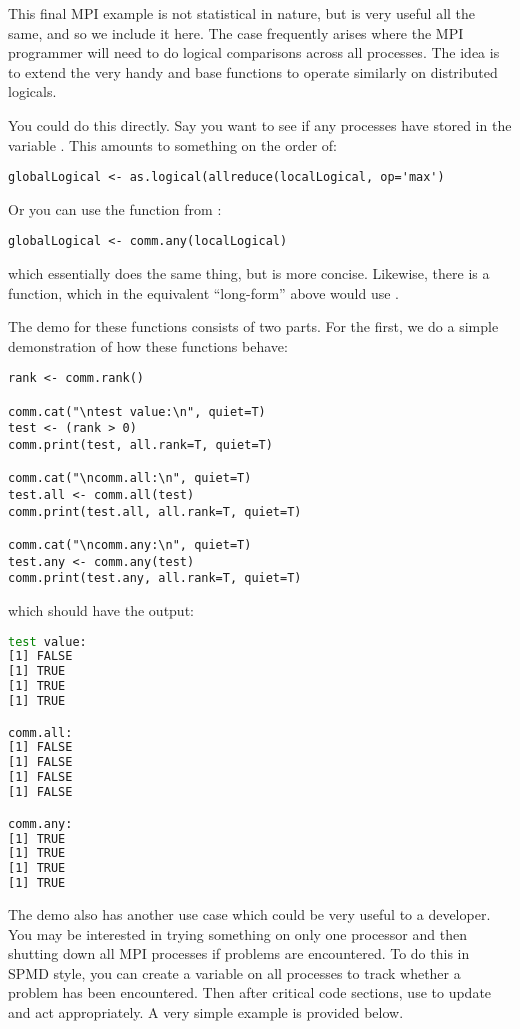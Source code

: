 This final MPI example is not statistical in nature, but is very useful
all the same, and so we include it here. The case frequently arises where
the MPI programmer will need to do logical comparisons across all processes.
The idea is to extend the very handy  and 
base  functions to operate similarly on distributed logicals.

You could do this directly. Say you want to see if any processes
have  stored in the variable .
This amounts to something on the order of:
\begin{lstlisting}[language=rr,title=R Code]
globalLogical <- as.logical(allreduce(localLogical, op='max')
\end{lstlisting}
Or you can use the function  from :
\begin{lstlisting}[language=rr,title=R Code]
globalLogical <- comm.any(localLogical)
\end{lstlisting}
which essentially does the same thing, but is more concise. Likewise,
there is a  function,
which in the equivalent ``long-form'' above would use .

The demo for these functions consists of two parts. For the first, we do a
simple demonstration of how these functions behave:
\begin{lstlisting}[language=rr,title=R Code]
rank <- comm.rank()

comm.cat("\ntest value:\n", quiet=T)
test <- (rank > 0)
comm.print(test, all.rank=T, quiet=T)

comm.cat("\ncomm.all:\n", quiet=T)
test.all <- comm.all(test)
comm.print(test.all, all.rank=T, quiet=T)

comm.cat("\ncomm.any:\n", quiet=T)
test.any <- comm.any(test)
comm.print(test.any, all.rank=T, quiet=T)
\end{lstlisting}
which should have the output:
\begin{lstlisting}[language=sh]
test value:
[1] FALSE
[1] TRUE
[1] TRUE
[1] TRUE

comm.all:
[1] FALSE
[1] FALSE
[1] FALSE
[1] FALSE

comm.any:
[1] TRUE
[1] TRUE
[1] TRUE
[1] TRUE
\end{lstlisting}

The demo also has another use case which could be very useful to a developer.
You may be interested in trying something on only one processor and then
shutting down all MPI processes if problems are encountered. To do this
in SPMD style, you can create a variable on all processes to track whether
a problem has been encountered. Then after critical code sections,
use 
to update and act appropriately.  A very simple example is provided below.

